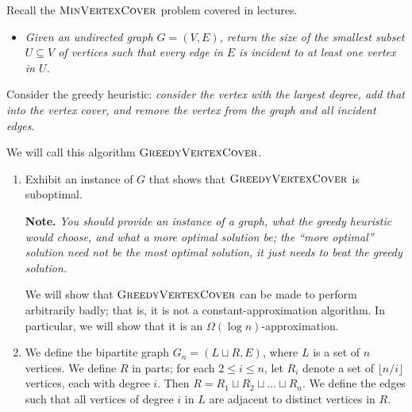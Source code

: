 \documentclass{article}
\begin{document}
\begin{question}
Recall the $\mathsf{\textsc{MinVertexCover}}$ problem covered in lectures.
\begin{itemize}
    \item[] {\em Given an undirected graph $G = (V, E)$, return the size of the smallest subset $U \subseteq V$ of vertices such that every edge in $E$ is incident to at least one vertex in $U$.}
\end{itemize}

Consider the greedy heuristic: {\em consider the vertex with the largest degree, add that into the vertex cover, and remove the vertex from the graph and all incident edges.}

We will call this algorithm $\mathsf{\textsc{GreedyVertexCover}}$.

\begin{enumerate}[label = (\alph*)]
    \item Exhibit an instance of $G$ that shows that $\mathsf{\textsc{GreedyVertexCover}}$ is suboptimal.

    {\bfseries Note.} {\em You should provide an instance of a graph, what the greedy heuristic would choose, and what a more optimal solution be; the ``more optimal'' solution need not be the most optimal solution, it just needs to beat the greedy solution.}

    We will show that $\mathsf{\textsc{GreedyVertexCover}}$ can be made to perform arbitrarily badly; that is, it is not a constant-approximation algorithm. In particular, we will show that it is an $\Omega(\log n)$-approximation.

    \item We define the bipartite graph $G_n = (L \sqcup R, E)$, where $L$ is a set of $n$ vertices. We define $R$ in parts; for each $2 \leq i \leq n$, let $R_i$ denote a set of $\lfloor n/i \rfloor$ vertices, each with degree $i$. Then $R = R_1 \sqcup R_2 \sqcup \dots \sqcup R_n$. We define the edges such that all vertices of degree $i$ in $L$ are adjacent to distinct vertices in $R$.

    \begin{figure}[H]
        \centering
\end{figure}
\end{enumerate}
\end{question}
\end{document}
